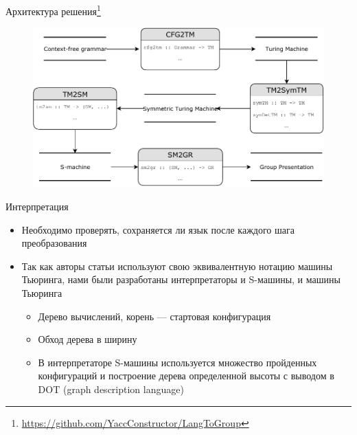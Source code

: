 \documentclass[xcolor=table]{beamer}
\begin{document}
\begin{frame}[fragile]{Архитектура решения\footnote{\url{https://github.com/YaccConstructor/LangToGroup}}}
\begin{figure}[H]
  \centering
  \includegraphics[width=120mm]{pictures/diplomaSmallUML.pdf}
 \end{figure}
\end{frame}

\begin{frame}[fragile]{Интерпретация}
\begin{itemize}
    \item Необходимо проверять, сохраняется ли язык после каждого шага преобразования
    \item Так как авторы статьи используют свою эквивалентную нотацию машины Тьюринга, нами были разработаны интерпретаторы и S-машины, и машины Тьюринга 
    \begin{itemize}
        \item Дерево вычислений, корень --- стартовая конфигурация
        \item Обход дерева в ширину
        \item В интерпретаторе S-машины используется множество пройденных конфигураций и построение дерева определенной высоты с выводом в DOT (graph description language)
    \end{itemize}
\end{itemize}
\end{frame}
\end{document}
